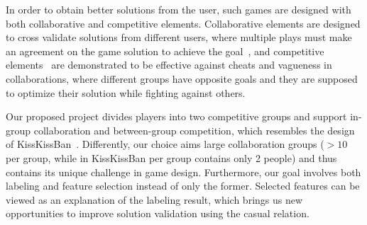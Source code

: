 In order to obtain better solutions from the user, such games are designed with both collaborative and competitive elements. Collaborative elements are designed to cross validate solutions from different users, where multiple plays must make an agreement on the game solution to achieve the goal~\cite{vonAhn:2006:PGL:1124772.1124782}, and competitive elements~\cite{ho2009kisskissban} are demonstrated to be effective against cheats and vagueness in collaborations, where different groups have opposite goals and they are supposed to optimize their solution while fighting against others.

Our proposed project divides players into two competitive groups and support in-group collaboration and between-group competition, which resembles the design of KissKissBan~\cite{ho2009kisskissban}. Differently, our choice aims large collaboration groups ($> 10$ per group, while in KissKissBan per group contains only 2 people) and thus contains its unique challenge in game design. Furthermore, our goal involves both labeling and feature selection instead of only the former. Selected features can be viewed as an explanation of the labeling result, which brings us new opportunities to improve solution validation using the casual relation. 

